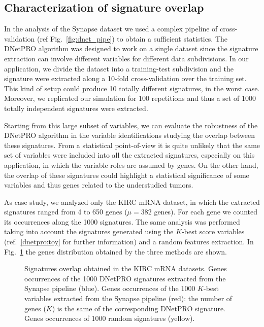 \documentclass{standalone}
\begin{document}
\subsection[Signature Overlap]{Characterization of signature overlap}\label{synapse:overlap}

In the analysis of the Synapse dataset we used a complex pipeline of cross-validation (ref Fig.~\ref{fig:dnet_pipe}) to obtain a sufficient statistics.
The DNetPRO algorithm was designed to work on a single dataset since the signature extraction can involve different variables for different data subdivisions.
In our application, we divide the dataset into a training-test subdivision and the signature were extracted along a 10-fold cross-validation over the training set.
This kind of setup could produce 10 totally different signatures, in the worst case.
Moreover, we replicated our simulation for 100 repetitions and thus a set of 1000 totally independent signatures were extracted.

Starting from this large subset of variables, we can evaluate the robustness of the DNetPRO algorithm in the variable identifications studying the overlap between these signatures.
From a statistical point-of-view it is quite unlikely that the same set of variables were included into all the extracted signatures, especially on this application, in which the variable roles are assumed by genes.
On the other hand, the overlap of these signatures could highlight a statistical significance of some variables and thus genes related to the understudied tumors.

As case study, we analyzed only the KIRC mRNA dataset, in which the extracted signatures ranged from 4 to 650 genes ($\mu=382$ genes).
For each gene we counted its occurrences along the 1000 signatures.
The same analysis was performed taking into account the signatures generated using the $K$-best score variables (ref.~\ref{dnetpro:toy} for further information) and a random features extraction.
In Fig.~\ref{fig:overlap} the genes distribution obtained by the three methods are shown.

\begin{figure}[htbp]
\centering
\def\svgwidth{0.6\textwidth}

\caption{Signatures overlap obtained in the KIRC mRNA datasets.
Genes occurrences of the 1000 DNetPRO signatures extracted from the Synapse pipeline (blue).
Genes occurrences of the 1000 $K$-best variables extracted from the Synapse pipeline (red): the number of genes ($K$) is the same of the corresponding DNetPRO signature.
Genes occurrences of 1000 random signatures (yellow).
}
\label{fig:overlap}
\end{figure}
\end{document}
